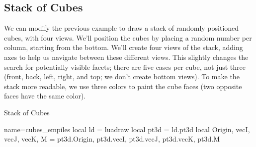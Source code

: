\subsection{Stack of Cubes}

We can modify the previous example to draw a stack of randomly positioned cubes, with four views. We'll position the cubes by placing a random number per column, starting from the bottom. We'll create four views of the stack, adding axes to help us navigate between these different views. This slightly changes the search for potentially visible facets; there are five cases per cube, not just three (front, back, left, right, and top; we don't create bottom views). To make the stack more readable, we use three colors to paint the cube faces (two opposite faces have the same color).

\begin{demo}{Stack of Cubes}
\begin{luadraw}{name=cubes_empiles}
local ld = luadraw
local pt3d = ld.pt3d
local Origin, vecI, vecJ, vecK, M = pt3d.Origin, pt3d.vecI, pt3d.vecJ, pt3d.vecK, pt3d.M


\end{luadraw}
\end{demo}
